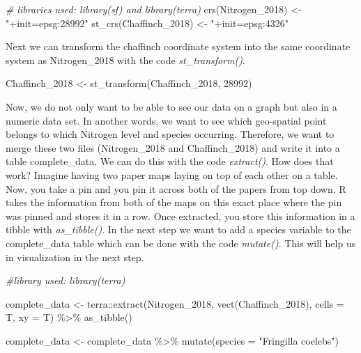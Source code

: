 \documentclass[
]{article}
\newenvironment{Shaded}{\begin{snugshade}}{\end{snugshade}}
\newcommand{\AttributeTok}[1]{\textcolor[rgb]{0.77,0.63,0.00}{#1}}
\newcommand{\CommentTok}[1]{\textcolor[rgb]{0.56,0.35,0.01}{\textit{#1}}}
\newcommand{\DecValTok}[1]{\textcolor[rgb]{0.00,0.00,0.81}{#1}}
\newcommand{\FunctionTok}[1]{\textcolor[rgb]{0.00,0.00,0.00}{#1}}
\newcommand{\NormalTok}[1]{#1}
\newcommand{\OtherTok}[1]{\textcolor[rgb]{0.56,0.35,0.01}{#1}}
\newcommand{\SpecialCharTok}[1]{\textcolor[rgb]{0.00,0.00,0.00}{#1}}
\newcommand{\StringTok}[1]{\textcolor[rgb]{0.31,0.60,0.02}{#1}}
\begin{document}
\begin{Shaded}
\begin{Highlighting}[]
\CommentTok{\# libraries used: library(sf) and library(terra)}
\FunctionTok{crs}\NormalTok{(Nitrogen\_2018) }\OtherTok{\textless{}{-}} \StringTok{"+init=epsg:28992"}
\FunctionTok{st\_crs}\NormalTok{(Chaffinch\_2018) }\OtherTok{\textless{}{-}} \StringTok{"+init=epsg:4326"}
\end{Highlighting}
\end{Shaded}

Next we can transform the chaffinch coordinate system into the same
coordinate system as Nitrogen\_2018 with the code
\emph{st\_transform()}.

\begin{Shaded}
\begin{Highlighting}[]
\NormalTok{Chaffinch\_2018 }\OtherTok{\textless{}{-}} \FunctionTok{st\_transform}\NormalTok{(Chaffinch\_2018, }\DecValTok{28992}\NormalTok{)}
\end{Highlighting}
\end{Shaded}

Now, we do not only want to be able to see our data on a graph but also
in a numeric data set. In another words, we want to see which
geo-spatial point belongs to which Nitrogen level and species occurring.
Therefore, we want to merge these two files (Nitrogen\_2018 and
Chaffinch\_2018) and write it into a table complete\_data. We can do
this with the code \emph{extract()}. How does that work? Imagine having
two paper maps laying on top of each other on a table. Now, you take a
pin and you pin it across both of the papers from top down. R takes the
information from both of the maps on this exact place where the pin was
pinned and stores it in a row. Once extracted, you store this
information in a tibble with \emph{as\_tibble()}. In the next step we
want to add a species variable to the complete\_data table which can be
done with the code \emph{mutate()}. This will help us in visualization
in the next step.

\begin{Shaded}
\begin{Highlighting}[]
\CommentTok{\#library used: library(terra)}

\NormalTok{complete\_data }\OtherTok{\textless{}{-}}\NormalTok{ terra}\SpecialCharTok{::}\FunctionTok{extract}\NormalTok{(Nitrogen\_2018, }\FunctionTok{vect}\NormalTok{(Chaffinch\_2018), }\AttributeTok{cells =}\NormalTok{ T, }\AttributeTok{xy =}\NormalTok{ T) }\SpecialCharTok{\%\textgreater{}\%} \FunctionTok{as\_tibble}\NormalTok{() }

\NormalTok{complete\_data }\OtherTok{\textless{}{-}}\NormalTok{ complete\_data }\SpecialCharTok{\%\textgreater{}\%} 
  \FunctionTok{mutate}\NormalTok{(}\AttributeTok{species =} \StringTok{"Fringilla coelebs"}\NormalTok{)}
\end{Highlighting}
\end{Shaded}
\end{document}
